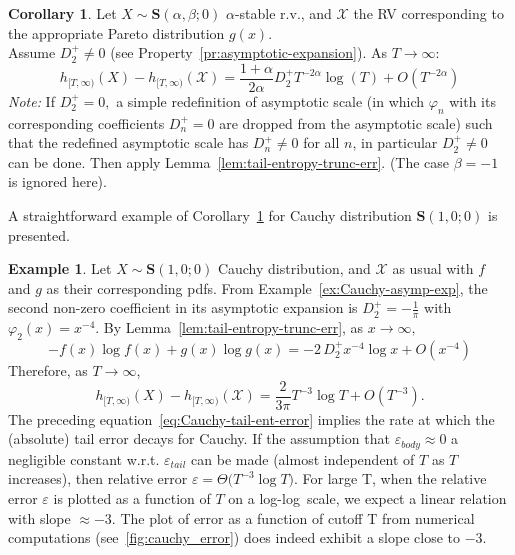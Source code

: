 \documentclass{article}
\theoremstyle{definition}
\newtheorem{corollary}[definition]{Corollary}
\newtheorem{example}[definition]{Example}
\begin{document}
\begin{corollary}\label{cor:tail-error-bound}
Let \(X\sim\mathbf{S}(\alpha,\beta;0)\) \(\alpha\)-stable r.v., and \(\mathcal{X}\) the RV corresponding to the appropriate Pareto distribution \(g(x)\).\\
Assume \(D_2^+\neq0\) (see Property~\ref{pr:asymptotic-expansion}). As \(T\to\infty\):
\begin{equation}
    h_{[T,\infty)}(X)-h_{[T,\infty)}(\mathcal{X})=\frac{1+\alpha}{2\alpha}D_2^+T^{-2\alpha}\log(T)+O(T^{-2\alpha})
\end{equation}
\textit{Note:} If \(D_2^+=0,\) a simple redefinition of asymptotic scale (in which \(\varphi_n\) with its corresponding coefficients \(D_n^+=0\) are dropped from the asymptotic scale) such that the redefined asymptotic scale has \(D_n^+\neq0\) for all \(n\), in particular \(D_2^+\neq0\) can be done. Then apply Lemma~\ref{lem:tail-entropy-trunc-err}. (The case \(\beta=-1\) is ignored here). 
\end{corollary}
A straightforward example of Corollary~\ref{cor:tail-error-bound} for Cauchy distribution \(\mathbf{S}(1,0;0)\) is presented.

\begin{example}
Let \(X\sim\mathbf{S}(1,0;0)\) Cauchy distribution, and \(\mathcal{X}\) as usual with \(f\) and \(g\) as their corresponding pdfs. From Example~\ref{ex:Cauchy-asymp-exp}, the second non-zero coefficient in its asymptotic expansion is \(D_2^+=-\frac{1}{\pi}\) with \(\varphi_2(x)=x^{-4}\). By Lemma~\ref{lem:tail-entropy-trunc-err}, as \(x\to\infty,\)
\begin{equation*}
    -f(x)\log f(x)+g(x)\log g(x)=-2\,D_2^+x^{-4}\log{x}+O(x^{-4})
\end{equation*}
Therefore, as \(T\to\infty\),
\begin{equation}\label{eq:Cauchy-tail-ent-error}
    h_{[T,\infty)}(X)-h_{[T,\infty)}(\mathcal{X})=\frac{2}{3\pi}T^{-3}\log{T}+O(T^{-3}).
\end{equation}
The preceding equation~\ref{eq:Cauchy-tail-ent-error} implies the rate at which the (absolute) tail error decays for Cauchy. If the assumption that \(\varepsilon_{body}\approx 0\) a negligible constant w.r.t. \(\varepsilon_{tail}\) can be made (almost independent of \(T\) as \(T\) increases), then relative error \(\varepsilon=\Theta(T^{-3}\log{T)}\).
For large T, when the relative error \(\varepsilon\) is plotted as a function of \(T\) on a log-log~scale, we expect a linear relation with slope \(\approx-3\). The plot of error as a function of cutoff T from numerical computations (see~\ref{fig:cauchy_error}) does indeed exhibit a slope close to \(-3\).
\end{example}
\end{document}
